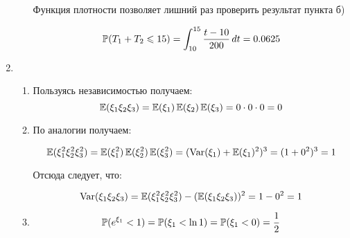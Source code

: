 \begin{enumerate}
\begin{enumerate}
	Функция плотности позволяет лишний раз проверить результат пункта б)
	
	\[
	    \P(T_{1}+T_{2} \le 15)= \int_{10}^{15} \frac{t-10}{200} \, dt = 0.0625
	\]
\end{enumerate}

\item 
\begin{enumerate}
	\item Пользуясь независимостью получаем:
	\[
	\E(\xi_{1}\xi_{2}\xi_{3})=\E(\xi_{1})\E(\xi_{2})\E(\xi_{3})=0 \cdot 0 \cdot 0=0
	\]
	\item По аналогии получаем:
	
	\[
	\E(\xi_{1}^2\xi_{2}^2\xi_{3}^2)=\E(\xi_{1}^2)\E(\xi_{2}^2)\E(\xi_{3}^2)=(\Var(\xi_{1})+\E(\xi_{1})^2)^3=(1+0^2)^3=1
	\]
	
	Отсюда следует, что:
	
	\[
	\Var(\xi_{1}\xi_{2}\xi_{3})=\E(\xi_{1}^2\xi_{2}^2\xi_{3}^2)-(\E(\xi_{1}\xi_{2}\xi_{3}))^2=1-0^2=1
	\]
	
	\item 
	\[
	\P(e^{\xi_1} < 1)=\P(\xi_{1}<\ln 1)=\P(\xi_1 < 0)=\frac{1}{2}
	\]
\end{enumerate}	



\end{enumerate}
